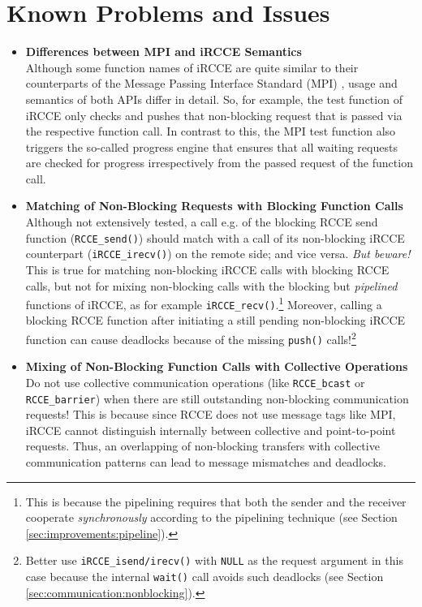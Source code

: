 \documentclass[fontsize=10pt, paper=a4, DIV12, pagesize=auto]{scrartcl}
\begin{document}
\section{Known Problems and Issues}\label{sec:problems}

\begin{itemize}

	\item {\sffamily\normalsize\textbf{Differences between MPI and iRCCE Semantics}} \\
Although some function names of iRCCE are quite similar to their counterparts of the Message Passing Interface Standard (MPI) \cite{MPI}, usage and semantics of both APIs differ in detail.
So, for example, the test function of iRCCE only checks and pushes that non-blocking request that is passed via the respective function call.
In contrast to this, the MPI test function also triggers the so-called progress engine that ensures that all waiting requests are checked for progress irrespectively from the passed request of the function call.

	\item{\sffamily\normalsize\textbf{Matching of Non-Blocking Requests with Blocking Function Calls}} \\
Although not extensively tested, a call e.g. of the blocking RCCE send function (\texttt{RCCE\_send()}) should match with a call of its non-blocking iRCCE counterpart (\texttt{iRCCE\_irecv()}) on the remote side; and vice versa.
\emph{But beware!} This is true for matching non-blocking iRCCE calls with blocking RCCE calls, but not for mixing non-blocking calls with the blocking but \emph{pipelined} functions of iRCCE, as for example \texttt{iRCCE\_recv()}.\footnote{This is because the pipelining requires that both the sender and the receiver cooperate \emph{synchronously} according to the pipelining technique (see Section \ref{sec:improvements:pipeline}).}
Moreover, calling a blocking RCCE function after initiating a still pending non-blocking iRCCE function can cause deadlocks because of the missing \texttt{push()} calls!\footnote{Better use \texttt{iRCCE\_isend/irecv()} with \texttt{NULL} as the request argument in this case because the internal \texttt{wait()} call avoids such deadlocks (see Section \ref{sec:communication:nonblocking}).}

	\item {\sffamily\normalsize\textbf{Mixing of Non-Blocking Function Calls with Collective Operations}} \\
Do not use collective communication operations (like \texttt{RCCE\_bcast} or \texttt{RCCE\_barrier}) when there are still outstanding non-blocking communication requests!
This is because since RCCE does not use message tags like MPI, iRCCE cannot distinguish internally between collective and point-to-point requests. 
Thus, an overlapping of non-blocking transfers with collective communication patterns can lead to message mismatches and deadlocks.


\end{itemize}
\end{document}
